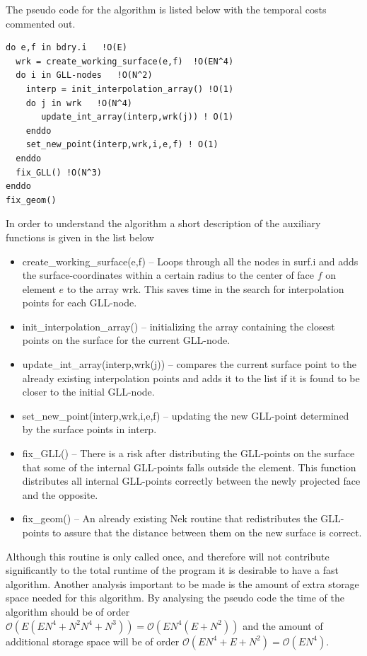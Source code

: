 The pseudo code for the algorithm is listed below with the temporal costs commented out.
%
\begingroup
\fontsize{12pt}{14pt}
\begin{lstlisting}[escapechar=|,frame=none]
do e,f in bdry.i   !O(E)
  wrk = create_working_surface(e,f)  !O(EN^4) 
  do i in GLL-nodes   !O(N^2)
    interp = init_interpolation_array() !O(1) 
    do j in wrk   !O(N^4)
       update_int_array(interp,wrk(j)) ! O(1)
    enddo
    set_new_point(interp,wrk,i,e,f) ! O(1)
  enddo
  fix_GLL() !O(N^3)
enddo
fix_geom()
\end{lstlisting}
\endgroup
% 
In order to understand the algorithm a short description of the auxiliary functions is 
given in the list below
\begin{itemize}
    \item create\_working\_surface(e,f) -- Loops through all the nodes in surf.i and adds the 
        surface-coordinates within a certain radius to the center of face $f$ on element $e$ to the array wrk.
        This saves time in the search for interpolation points for each GLL-node.
    \item init\_interpolation\_array() -- initializing the array containing the closest 
        points on the surface for the current GLL-node. 
    \item update\_int\_array(interp,wrk(j)) -- compares the current surface point to the 
        already existing interpolation points and adds it to the list if it is found to 
        be closer to the initial GLL-node.
    \item set\_new\_point(interp,wrk,i,e,f) -- updating the new GLL-point determined by the 
        surface points in interp.
    \item fix\_GLL() -- There is a risk after distributing the GLL-points on the surface that
        some of the internal GLL-points falls outside the element. This function distributes 
        all internal GLL-points correctly between the newly projected face and the opposite.
    \item fix\_geom() -- An already existing Nek routine that redistributes the GLL-points to 
        assure that the distance between them on the new surface is correct.
\end{itemize}

Although this routine is only called once, and therefore will not contribute significantly 
to the total runtime of the program it is desirable to have a fast algorithm. Another analysis
important to be made is the amount of extra storage space needed for this algorithm.
By analysing the pseudo code the time of the algorithm should be of order $\mathcal{O}(E(EN^4+N^2N^4+N^3))=\mathcal{O}(EN^4(E+N^2))$
and the amount of additional storage space will be of order $\mathcal{O}(EN^4+E+N^2)=\mathcal{O}(EN^4)$.

